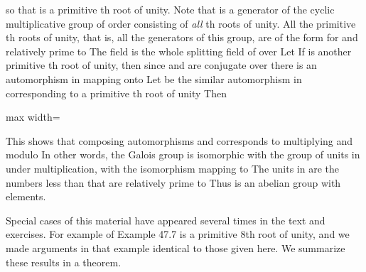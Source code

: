 \documentclass[11pt,oneside]{article}
\begin{document}
\begin{BookBody}

\noindent so that \BookInline{\zeta } is a primitive th root of unity. Note that \BookInline{\zeta } is a generator of the cyclic multiplicative group of order  consisting of\textit{ all} th roots of unity. All the primitive th roots of unity, that is, all the generators of this group, are of the form  for  and  relatively prime to  The field  is the whole splitting field of  over  Let  If  is another primitive th root of unity, then since \BookInline{\zeta } and  are conjugate over  there is an automorphism  in  mapping \BookInline{\zeta } onto  Let  be the similar automorphism in  corresponding to a primitive th root of unity  Then

\begin{center}\begin{adjustbox}{max width=\linewidth}\end{adjustbox}\end{center}

\noindent This shows that composing automorphisms  and  corresponds to multiplying  and  modulo  In other words, the Galois group  is isomorphic with the group of units in  under multiplication, with the isomorphism mapping  to  The units in  are the numbers less than  that are relatively prime to  Thus  is an abelian group with  elements.

Special cases of this material have appeared several times in the text and exercises. For example\BookInline{,\allowbreak \alpha } of Example 47.7 is a primitive 8th root of unity, and we made arguments in that example identical to those given here. We summarize these results in a theorem.


\end{BookBody}
\end{document}
